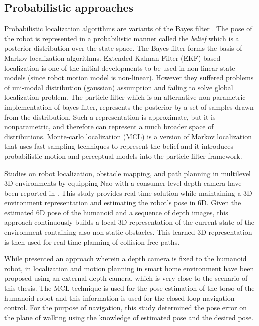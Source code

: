 \subsection{Probabilistic approaches}
\label{ssec:prob_approaches}
Probabilistic localization algorithms are variants of the Bayes filter \cite{thrun2005probabilistic}. The pose of the robot is represented in a probabilistic manner called the \emph{belief} which is a posterior distribution over the state space. The Bayes filter \cite{thrun2005probabilistic} forms the basis of Markov localization algorithms. Extended Kalman Filter (EKF) based localization is one of the initial developments to be used in non-linear state models (since robot motion model is non-linear). However they suffered problems of uni-modal distribution (gaussian) assumption and failing to solve global localization problem. The particle filter \cite{thrun2005probabilistic} which is an alternative non-parametric implementation of bayes filter, represents the posterior by a set of samples drawn from the distribution. Such a representation is approximate, but it is nonparametric, and therefore can represent a much broader space of distributions. Monte-carlo localization (MCL) \cite{fox1999monte} is a version of Markov localization that uses fast sampling techniques to represent the belief and it introduces probabilistic motion and perceptual models into the particle filter framework.
	
Studies on robot localization, obstacle mapping, and path planning in multilevel 3D environments by equipping Nao with a consumer-level depth camera have been reported in \cite{maier2012real}. This study provides real-time solution while maintaining a 3D environment representation and estimating the robot’s pose in 6D. Given the estimated 6D pose of the humanoid and a sequence of depth images, this approach continuously builds a local 3D representation of the current state of the environment containing also non-static obstacles. This learned 3D representation is then used for real-time planning of collision-free paths. 
	
While \cite{maier2012real} presented an approach wherein a depth camera is fixed to the humanoid robot, in \cite{cervera2012localization} localization and motion planning in smart home environment have been proposed using an external depth camera, which is very close to the scenario of this thesis. The MCL technique is used for the pose estimation of the torso of the humanoid robot and this information is used for the closed loop navigation control. For the purpose of navigation, this study determined the pose error on the plane of walking using the knowledge of estimated pose and the desired pose. 
	
